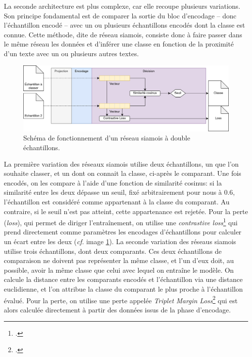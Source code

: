 La seconde architecture est plus complexe, car elle recoupe plusieurs variations. Son principe fondamental est de comparer la sortie du bloc d'encodage -- donc l'échantillon encodé -- avec un ou plusieurs échantillons encodés dont la classe est connue. Cette méthode, dite de réseau siamois, consiste donc à faire passer dans le même réseau les données et d'inférer une classe en fonction de la proximité d'un texte avec un ou plusieurs autres textes. 


\begin{figure}[ht]
    \centering
    \includegraphics[width=\linewidth]{figures/chap4/contrastive.png}
    \caption{Schéma de fonctionnement d'un réseau siamois à double échantillons.}
    \label{fig:chap4:reseau:ContrastiveLoss}
\end{figure}

La première variation des réseaux siamois utilise deux échantillons, un que l'on souhaite classer, et un dont on connait la classe, ci-après le comparant. Une fois encodés, on les compare à l'aide d'une fonction de similarité cosinus: si la similarité entre les deux dépasse un seuil, fixé arbitrairement pour nous à 0.6, l'échantillon est considéré comme appartenant à la classe du comparant. Au contraire, si le seuil n'est pas atteint, cette appartenance est rejetée. Pour la perte (\textit{loss}), qui permet de diriger l'entraînement, on utilise une \textit{contrastive loss}\footcite[Entre autres, ]{khosla_supervised_2021} qui prend directement comme paramètres les encodages d'échantillons pour calculer un écart entre les deux (\textit{cf.} image \ref{fig:chap4:reseau:ContrastiveLoss}). La seconde variation des réseaus siamois utilise trois échantillons, dont deux comparants. Ces deux échantillons de comparaison ne doivent pas représenter la même classe, et l'un d'eux doit, au possible, avoir la même classe que celui avec lequel on entraîne le modèle. On calcule la distance entre les comparants encodés et l'échantillon via une distance euclidienne, et l'on attribue la classe du comparant le plus proche à l'échantillon évalué. Pour la perte, on utilise une perte appelée \textit{Triplet Margin Loss}\footcite{hermans_defense_2017} qui est alors calculée directement à partir des données issus de la phase d'encodage.

